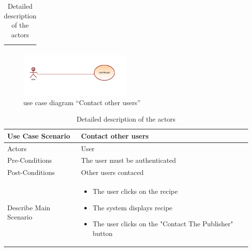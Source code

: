 \documentclass{article}
\begin{document}
{{{\begin{table}[h]
\begin{tabularx}{\textwidth}{X|X}
\begin{itemize}[label=$\bullet$]
           
        \end{itemize} \\
        \bottomrule
    \end{tabularx}
    \caption{Detailed description of the actors}
    \label{tab:actors_roles}
\end{table}






















\newpage


\begin{figure}[htbp]
    \centering
    \includegraphics[width=0.5\textwidth]{Addrecipee}
    \caption{use case diagram “Contact other users”}
    \label{fig:design2}
\end{figure}
\begin{table}[h]
    \centering
    \begin{tabularx}{\textwidth}{X|X}
        \toprule
        Use Case Scenario & Contact other users \\
        \midrule
        Actors & User \\
        \midrule
        Pre-Conditions & The user must be authenticated \\
        \midrule
	 Post-Conditions & Other users contaced  \\
        \midrule
        Describe Main Scenario &  \begin{itemize}[label=$\bullet$]
            \item The user clicks on the recipe
            \item The system displays recipe
            \item The user clicks on the "Contact The Publisher" button
        \end{itemize} \\
        \bottomrule
    \end{tabularx}
    \caption{Detailed description of the actors}
    \label{tab:actors_roles}
\end{table}















}}}
\end{document}
